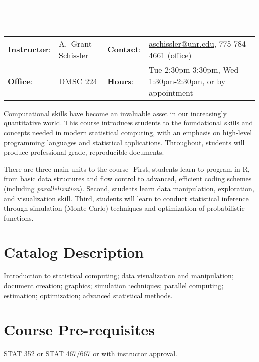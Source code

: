 \documentclass[11pt,onecolumn]{article}
\title{\textbf{\coursename}}
\author{{\semester}---{\roomnumb}---{\classtimes}}
\date{}
\makeatletter
\newcommand{\myname}{A.~Grant Schissler}
\newcommand{\myemail}{aschissler@unr.edu}
\newcommand{\office}{DMSC 224}
\newcommand{\officehours}{Tue 2:30pm-3:30pm, Wed 1:30pm-2:30pm, or by appointment}
\makeatother
\begin{document}
\maketitle

\vspace{-0.25in}
\noindent\makebox[\linewidth]{\rule{\textwidth}{1pt}}

\begin{center}
\begin{tabular}{llll}
\textbf{Instructor}:&\myname & \textbf{Contact}:&\href{mailto:\myemail}{\myemail}, 775-784-4661 (office)\\
\textbf{Office}:&\office & \textbf{Hours}:&\officehours\\
\end{tabular}
\end{center}

Computational skills have become an invaluable asset in our increasingly quantitative world. This course introduces students to the foundational skills and concepts needed in modern statistical computing, with an emphasis on high-level programming languages and statistical applications. Throughout, students will produce professional-grade, reproducible documents.

There are three main units to the course:~First, students learn to program in R, from basic data structures and flow control to advanced, efficient coding schemes (including \textit{parallelization}). Second, students learn data manipulation, exploration, and visualization skill. Third, students will learn to conduct statistical inference through simulation (Monte Carlo) techniques and optimization of probabilistic functions.

\section*{Catalog Description}
Introduction to statistical computing; data visualization and manipulation; document creation; graphics; simulation techniques; parallel computing; estimation; optimization; advanced statistical methods.

\section*{Course Pre-requisites}
STAT 352 or STAT 467/667 or with instructor approval.
\end{document}
